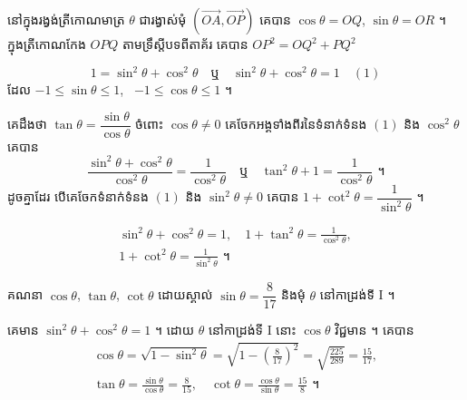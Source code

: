 នៅក្នុងរង្វង់ត្រីកោណមាត្រ $\theta$ ជារង្វាស់មុំ $(\overrightarrow{OA}, \overrightarrow{OP})$ គេបាន $\cos\theta = OQ$, $\sin\theta = OR$ ។ ក្នុងត្រីកោណកែង $OPQ$ តាមទ្រឹស្តីបទពីតាគ័រ គេបាន $OP^2 = OQ^2 + PQ^2$
\begin{center}
\end{center}
\[ 1 = \sin^2\theta + \cos^2\theta \quad \text{ឬ} \quad \sin^2\theta + \cos^2\theta = 1 \quad (1) \]
ដែល $-1 \le \sin\theta \le 1$, \ $-1 \le \cos\theta \le 1$ ។

គេដឹងថា $\tan\theta = \dfrac{\sin\theta}{\cos\theta}$ ចំពោះ $\cos\theta \ne 0$ គេចែកអង្គទាំងពីរនៃទំនាក់ទំនង $(1)$ និង $\cos^2\theta$ គេបាន
\[ \frac{\sin^2\theta + \cos^2\theta}{\cos^2\theta} = \frac{1}{\cos^2\theta} \quad \text{ឬ} \quad \tan^2\theta + 1 = \frac{1}{\cos^2\theta} \text{ ។} \]
ដូចគ្នាដែរ បើគេចែកទំនាក់ទំនង $(1)$ និង $\sin^2\theta \ne 0$ គេបាន $1 + \cot^2\theta = \dfrac{1}{\sin^2\theta}$ ។

\begin{formulaBox}[គេបានរូបមន្ត]
\[
\begin{gathered}
\sin^2\theta + \cos^2\theta = 1, \quad 1 + \tan^2\theta = \frac{1}{\cos^2\theta},\\
1 + \cot^2\theta = \frac{1}{\sin^2\theta} \text{ ។}
\end{gathered}
\]
\end{formulaBox}

\begin{example}[ឧទាហរណ៍]
គណនា $\cos\theta$, $\tan\theta$, $\cot\theta$ ដោយស្គាល់ $\sin\theta = \dfrac{8}{17}$ និងមុំ $\theta$ នៅកាដ្រង់ទី I ។

គេមាន $\sin^2\theta + \cos^2\theta = 1$ ។ ដោយ $\theta$ នៅកាដ្រង់ទី I នោះ $\cos\theta$ វិជ្ជមាន ។ គេបាន
\[
\begin{gathered}
\cos\theta = \sqrt{1 - \sin^2\theta} = \sqrt{1 - \left(\frac{8}{17}\right)^2} = \sqrt{\frac{225}{289}} = \frac{15}{17},\\
\tan\theta = \frac{\sin\theta}{\cos\theta} = \frac{8}{15}, \quad \cot\theta = \frac{\cos\theta}{\sin\theta} = \frac{15}{8} \text{ ។}
\end{gathered}
\]
\end{example}


